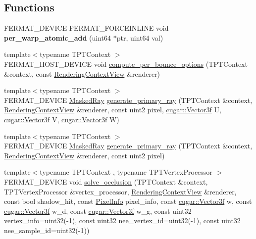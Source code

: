 \subsection*{Functions}
\begin{DoxyCompactItemize}
\item 
\mbox{\label{group___p_t_lib_core_ga466e8418027036766993ca8d1fa56f72}} 
F\+E\+R\+M\+A\+T\+\_\+\+D\+E\+V\+I\+CE F\+E\+R\+M\+A\+T\+\_\+\+F\+O\+R\+C\+E\+I\+N\+L\+I\+NE void {\bfseries per\+\_\+warp\+\_\+atomic\+\_\+add} (uint64 $\ast$ptr, uint64 val)
\item 
{\footnotesize template$<$typename T\+P\+T\+Context $>$ }\\F\+E\+R\+M\+A\+T\+\_\+\+H\+O\+S\+T\+\_\+\+D\+E\+V\+I\+CE void \hyperlink{group___p_t_lib_core_gae5f75dfb6260b3548edccfbf9a48392b}{compute\+\_\+per\+\_\+bounce\+\_\+options} (T\+P\+T\+Context \&context, const \hyperlink{struct_rendering_context_view}{Rendering\+Context\+View} \&renderer)
\item 
{\footnotesize template$<$typename T\+P\+T\+Context $>$ }\\F\+E\+R\+M\+A\+T\+\_\+\+D\+E\+V\+I\+CE \hyperlink{struct_masked_ray}{Masked\+Ray} \hyperlink{group___p_t_lib_core_ga28fe33ab0663b2331fe607662ed07349}{generate\+\_\+primary\+\_\+ray} (T\+P\+T\+Context \&context, \hyperlink{struct_rendering_context_view}{Rendering\+Context\+View} \&renderer, const uint2 pixel, \hyperlink{structcugar_1_1_vector}{cugar\+::\+Vector3f} U, \hyperlink{structcugar_1_1_vector}{cugar\+::\+Vector3f} V, \hyperlink{structcugar_1_1_vector}{cugar\+::\+Vector3f} W)
\item 
{\footnotesize template$<$typename T\+P\+T\+Context $>$ }\\F\+E\+R\+M\+A\+T\+\_\+\+D\+E\+V\+I\+CE \hyperlink{struct_masked_ray}{Masked\+Ray} \hyperlink{group___p_t_lib_core_gad7631579fff5bf25e126c0f3aa01925b}{generate\+\_\+primary\+\_\+ray} (T\+P\+T\+Context \&context, \hyperlink{struct_rendering_context_view}{Rendering\+Context\+View} \&renderer, const uint2 pixel)
\item 
{\footnotesize template$<$typename T\+P\+T\+Context , typename T\+P\+T\+Vertex\+Processor $>$ }\\F\+E\+R\+M\+A\+T\+\_\+\+D\+E\+V\+I\+CE void \hyperlink{group___p_t_lib_core_gaf412a8df33284bc708b0a6d90262bc69}{solve\+\_\+occlusion} (T\+P\+T\+Context \&context, T\+P\+T\+Vertex\+Processor \&vertex\+\_\+processor, \hyperlink{struct_rendering_context_view}{Rendering\+Context\+View} \&renderer, const bool shadow\+\_\+hit, const \hyperlink{union_pixel_info}{Pixel\+Info} pixel\+\_\+info, const \hyperlink{structcugar_1_1_vector}{cugar\+::\+Vector3f} w, const \hyperlink{structcugar_1_1_vector}{cugar\+::\+Vector3f} w\+\_\+d, const \hyperlink{structcugar_1_1_vector}{cugar\+::\+Vector3f} w\+\_\+g, const uint32 vertex\+\_\+info=uint32(-\/1), const uint32 nee\+\_\+vertex\+\_\+id=uint32(-\/1), const uint32 nee\+\_\+sample\+\_\+id=uint32(-\/1))

\end{DoxyCompactItemize}
